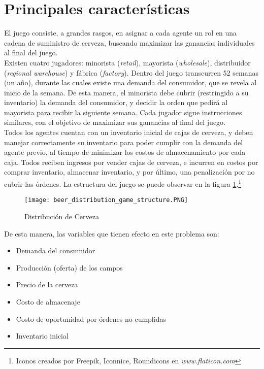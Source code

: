 \section{Principales caracter\'isticas}

El juego consiste, a grandes rasgos, en asignar a cada agente un rol en una cadena de suministro de cerveza, buscando maximizar las ganancias individuales al final del juego.\\

Existen cuatro jugadores: minorista (\textit{retail}), mayorista (\textit{wholesale}), distribuidor (\textit{regional warehouse}) y f\'abrica (\textit{factory}). Dentro del juego transcurren 52 semanas (un a\~no), durante las cuales existe una demanda del consumidor, que se revela al inicio de la semana. De esta manera, el minorista debe cubrir (restringido a su inventario) la demanda del consumidor, y decidir la orden que pedir\'a al mayorista para recibir la siguiente semana. Cada jugador sigue instrucciones similares, con el objetivo de maximizar sus ganancias al final del juego.\\

Todos los agentes cuentan con un inventario inicial de cajas de cerveza,  y deben manejar correctamente su inventario para poder cumplir con la demanda del agente previo, al tiempo de minimizar los costos de almacenamiento por cada caja. Todos reciben ingresos por vender cajas de cerveza, e incurren en costos por comprar inventario, almacenar inventario, y por \'ultimo, una penalizaci\'on por no cubrir las \'ordenes. La estructura del juego se puede observar en la figura \ref{structure}.\footnote{Iconos creados por Freepik, Iconnice, Roundicons en \textit{www.flaticon.com}}\\


\begin{figure}[h]
\caption{Distribuci\'on de Cerveza}
\label{structure}
\texttt{[image: beer\_distribution\_game\_structure.PNG]}
\centering
\end{figure}

De esta manera, las variables que tienen efecto en este problema son:

\begin{itemize}
    \item Demanda del consumidor
    \item Producci\'on (oferta) de los campos
    \item Precio de la cerveza
    \item Costo de almacenaje
    \item Costo de oportunidad por \'ordenes no cumplidas
    \item Inventario inicial
\end{itemize}

